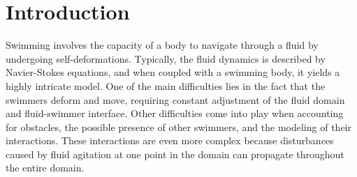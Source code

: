 \documentclass[graybox]{svmult}
\begin{document}
\section{Introduction}


Swimming involves the capacity of a body to navigate through a fluid by undergoing self-deformations. Typically, the fluid dynamics is described by Navier-Stokes equations, and when coupled with a swimming body, it yields a highly intricate model. One of the main difficulties lies in the fact that the swimmers deform and move, requiring constant adjustment of the fluid domain and fluid-swimmer interface. Other difficulties come into play when accounting for obstacles, the possible presence of other swimmers, and the modeling of their interactions. These interactions are even more complex because disturbances caused by fluid agitation at one point in the domain can propagate throughout the entire domain.
\end{document}
